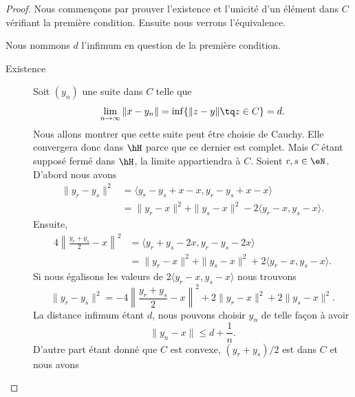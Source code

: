 \begin{proof}
	Nous commençons par prouver l'existence et l'unicité d'un élément dans \( C\) vérifiant la première condition. Ensuite nous verrons l'équivalence.

	Nous nommons \( d\) l'infimum en question de la première condition.
	\begin{description}
		\item[Existence]
		      Soit \( (y_n)\) une suite dans \( C\) telle que
		      \begin{equation}
			      \lim_{n\to \infty} \| x-y_n \|=\inf\{ \| z-y \|\tq z\in C \}=d.
		      \end{equation}
		      Nous allons montrer que cette suite peut être choisie de Cauchy. Elle convergera donc dans \( \hH\) parce que ce dernier est complet. Mais \( C\) étant supposé fermé dans \( \hH\), la limite appartiendra à \( C\). Soient \( r,s\in \eN\). D'abord nous avons
		      \begin{subequations}
			      \begin{align}
				      \| y_r-y_s \|^2 & =\langle y_r-y_s+x-x, y_r-y_s+x-x\rangle                    \\
				                      & =\| y_r-x \|^2+\| y_s-x \|^2-2\langle y_r-x, y_s-x\rangle .
			      \end{align}
		      \end{subequations}
		      Ensuite,
		      \begin{subequations}
			      \begin{align}
				      4\left\| \frac{ y_r+y_s }{2}-x \right\|^2 & =\langle y_r+y_s-2x, y_r-y_s-2x\rangle                      \\
				                                                & =\| y_r-x \|^2+\| y_s-x \|^2+2\langle y_r-x, y_s-x\rangle .
			      \end{align}
		      \end{subequations}
		      Si nous égalisons les valeurs de \( 2\langle y_r-x, y_s-x\rangle \) nous trouvons
		      \begin{equation}    \label{EqiqCyUa}
			      \| y_r-y_s \|^2=-4\left\| \frac{ y_r+y_s }{2}-x \right\|^2+2\| y_r-x \|^2+2\| y_s-x \|^2.
		      \end{equation}
		      La distance infimum étant \( d\), nous pouvons choisir \( y_n\) de telle façon à avoir
		      \begin{equation}
			      \| y_n-x \|\leq d+\frac{1}{ n }.
		      \end{equation}
		      D'autre part étant donné que \( C\) est convexe, \( (y_r+y_s)/2\) est dans \( C\) et nous avons

\end{description}
\end{proof}
